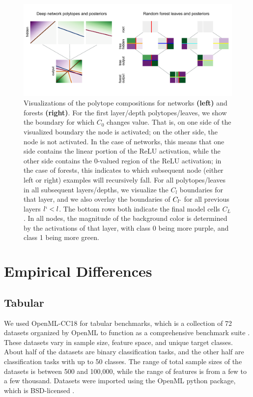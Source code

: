 \begin{figure}
\centering
\includegraphics[width=1.0\textwidth]{figures/polytopes}
  \caption{Visualizations of the polytope compositions for networks \textbf{(left)} and forests \textbf{(right)}. For the first layer/depth polytopes/leaves, we show the boundary for which $C_0$ changes value. That is, on one side of the visualized boundary the node is activated; on the other side, the node is not activated. In the case of networks, this means that one side contains the linear portion of the ReLU activation, while the other side contains the 0-valued region of the ReLU activation; in the case of forests, this indicates to which subsequent node (either left or right) examples will recursively fall. For all polytopes/leaves in all subsequent layers/depths, we visualize the $C_l$ boundaries for that layer, and we also overlay the boundaries of $C_{l`}$ for all previous layers $l` < l$. The bottom rows both indicate the final model cells $C_L$. 
  In all nodes, the magnitude of the background color is determined by the activations of that layer, with class 0 being more purple, and class 1 being more green. 
  }
\label{fig:posteriors}
\end{figure}

\section{Empirical Differences}
\subsection{Tabular}
\label{tabular}
We used OpenML-CC18 for tabular benchmarks, which is a collection of 72 datasets organized by OpenML to function as a comprehensive benchmark suite \citep{OpenML2013, bischl}. These datasets vary in sample size, feature space, and unique target classes.
About half of the datasets are binary classification tasks, and the other half are classification tasks with up to 50 classes. The range of total sample sizes of the datasets is between 500 and 100,000, while the range of features is from a few to a few thousand.
Datasets were imported using the OpenML python package, which is BSD-licensed \citep{OpenMLPython2019}.

